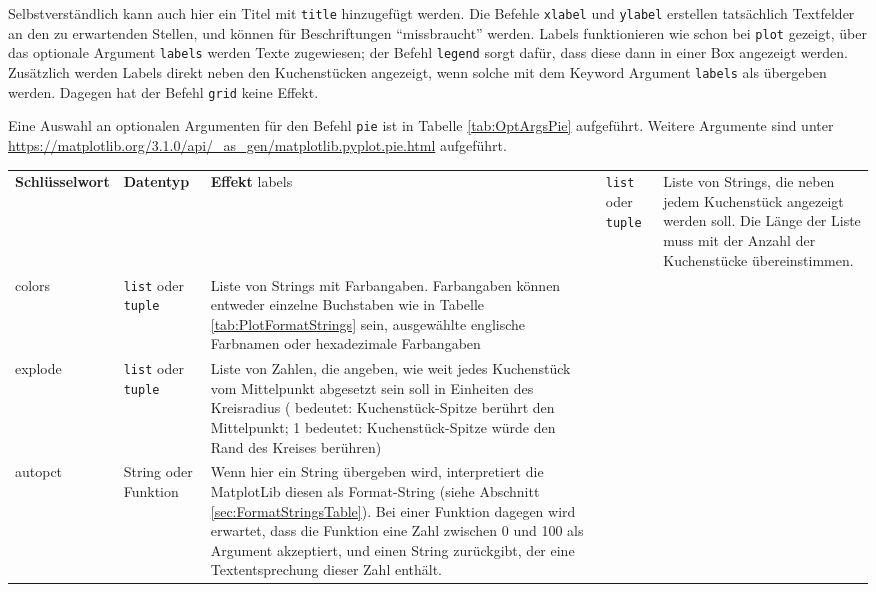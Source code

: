 Selbstverständlich kann auch hier ein Titel mit \texttt{title} hinzugefügt werden. Die Befehle \texttt{xlabel} und \texttt{ylabel} erstellen tatsächlich Textfelder an den zu erwartenden Stellen, und können für Beschriftungen \enquote{missbraucht} werden. Labels funktionieren wie schon bei \texttt{plot} gezeigt, \ie über das optionale Argument \texttt{labels} werden Texte zugewiesen; der Befehl \texttt{legend} sorgt dafür, dass diese dann in einer Box angezeigt werden. Zusätzlich werden Labels direkt neben den Kuchenstücken angezeigt, wenn solche mit dem Keyword Argument \texttt{labels} als  übergeben werden. Dagegen hat der Befehl \texttt{grid} keine Effekt. 

Eine Auswahl an optionalen Argumenten für den Befehl \texttt{pie} ist in Tabelle \ref{tab:OptArgsPie} aufgeführt. Weitere Argumente sind unter \url{https://matplotlib.org/3.1.0/api/_as_gen/matplotlib.pyplot.pie.html} aufgeführt.

\begin{tcolorbox}[title=Auswahl an Optionalen Argumenten bei \texttt{pie}]
	\begin{tabularx}
		{\linewidth}
		{>{\ttfamily}p{.2\linewidth} | p{.2\linewidth} p{.5\linewidth}}
		\textrm{\textbf{Schlüsselwort}} & \textbf{Datentyp} & \textbf{Effekt} \tabcrlf
		labels & 
			\texttt{list} oder \texttt{tuple} &
			Liste von Strings, die neben jedem Kuchenstück angezeigt werden soll. Die Länge der Liste muss mit der Anzahl der Kuchenstücke
			 übereinstimmen.\\
		colors &
			\texttt{list} oder \texttt{tuple} &
			Liste von Strings mit Farbangaben. Farbangaben können entweder einzelne Buchstaben wie in Tabelle \ref{tab:PlotFormatStrings} sein, ausgewählte englische
			Farbnamen oder hexadezimale Farbangaben \\
		explode &
			\texttt{list} oder \texttt{tuple} &
			Liste von Zahlen, die angeben, wie weit jedes Kuchenstück vom Mittelpunkt abgesetzt sein soll in Einheiten des Kreisradius ( bedeutet: Kuchenstück-Spitze
			berührt den Mittelpunkt; 1 bedeutet: Kuchenstück-Spitze würde den Rand des Kreises berühren) \\
		autopct &
			String oder Funktion &
			Wenn hier ein String übergeben wird, interpretiert die MatplotLib diesen als Format-String (siehe Abschnitt \ref{sec:FormatStringsTable}).
			Bei einer Funktion dagegen wird erwartet, dass die Funktion eine Zahl zwischen 0 und 100 als Argument akzeptiert, und einen String zurückgibt, der eine
			Textentsprechung dieser Zahl enthält.
	\end{tabularx}
	\label{tab:OptArgsPie}
\end{tcolorbox}

